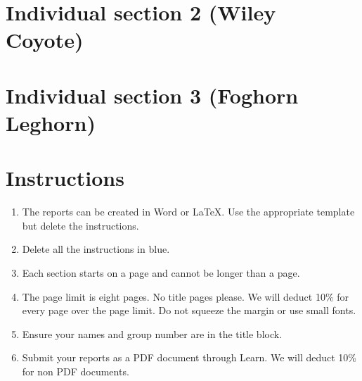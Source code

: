 \documentclass[a4paper,12pt]{article}
\begin{document}
\section{Individual section 2 (Wiley Coyote)}


\section{Individual section 3 (Foghorn Leghorn)}


\color{blue}
\section*{Instructions}

\begin{enumerate}
\item The reports can be created in Word or \LaTeX.  Use the
  appropriate template but delete the instructions.

\item Delete all the instructions in blue.

\item Each section starts on a page and cannot be longer than a page.

\item The page limit is eight pages.  No title pages please.  We will
  deduct 10\% for every page over the page limit.  Do not squeeze the
  margin or use small fonts.

\item Ensure your names and group number are in the title block.

\item Submit your reports as a PDF document through Learn.  We will
  deduct 10\% for non PDF documents.
\end{enumerate}
\end{document}
